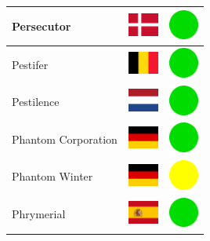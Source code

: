 \documentclass[12pt, a4paper, twoside]{report}
\begin{document}
\begin{center}
\begin{longtable}{|p{5cm}|p{2cm}|p{2cm}|}
 Persecutor                                                 & \includegraphics[width=1cm]{../img/flags/dk} &   \includegraphics[width=1cm]{../likes/y} \\ \hline
 Pestifer                                                   & \includegraphics[width=1cm]{../img/flags/be} &   \includegraphics[width=1cm]{../likes/y} \\ \hline
 Pestilence                                                 & \includegraphics[width=1cm]{../img/flags/nl} &   \includegraphics[width=1cm]{../likes/y} \\ \hline
 Phantom Corporation                                        & \includegraphics[width=1cm]{../img/flags/de} &   \includegraphics[width=1cm]{../likes/y} \\ \hline
 Phantom Winter                                             & \includegraphics[width=1cm]{../img/flags/de} &   \includegraphics[width=1cm]{../likes/m} \\ \hline
 Phrymerial                                                 & \includegraphics[width=1cm]{../img/flags/es} &   \includegraphics[width=1cm]{../likes/y} \\ \hline

\end{longtable}
\end{center}
\end{document}
